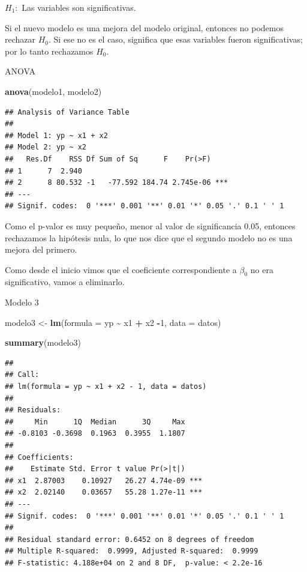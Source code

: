 \documentclass[
]{book}
\newenvironment{Shaded}{\begin{snugshade}}{\end{snugshade}}
\newcommand{\AttributeTok}[1]{\textcolor[rgb]{0.13,0.29,0.53}{#1}}
\newcommand{\DecValTok}[1]{\textcolor[rgb]{0.00,0.00,0.81}{#1}}
\newcommand{\FunctionTok}[1]{\textcolor[rgb]{0.13,0.29,0.53}{\textbf{#1}}}
\newcommand{\NormalTok}[1]{#1}
\newcommand{\OtherTok}[1]{\textcolor[rgb]{0.56,0.35,0.01}{#1}}
\newcommand{\SpecialCharTok}[1]{\textcolor[rgb]{0.81,0.36,0.00}{\textbf{#1}}}
\begin{document}
\(H_1:\) Las variables son significativas.

Si el nuevo modelo es una mejora del modelo original, entonces no podemos rechazar \(H_0\). Si ese no es el caso, significa que esas variables fueron significativas; por lo tanto rechazamos \(H_0\).

ANOVA

\begin{Shaded}
\begin{Highlighting}[]
\FunctionTok{anova}\NormalTok{(modelo1, modelo2)}
\end{Highlighting}
\end{Shaded}

\begin{verbatim}
## Analysis of Variance Table
## 
## Model 1: yp ~ x1 + x2
## Model 2: yp ~ x2
##   Res.Df    RSS Df Sum of Sq      F    Pr(>F)    
## 1      7  2.940                                  
## 2      8 80.532 -1   -77.592 184.74 2.745e-06 ***
## ---
## Signif. codes:  0 '***' 0.001 '**' 0.01 '*' 0.05 '.' 0.1 ' ' 1
\end{verbatim}

Como el p-valor es muy pequeño, menor al valor de significancia 0.05, entonces rechazamos la hipótesis nula, lo que nos dice que el segundo modelo no es una mejora del primero.

Como desde el inicio vimos que el coeficiente correspondiente a \(\beta_0\) no era significativo, vamos a eliminarlo.

Modelo 3

\begin{Shaded}
\begin{Highlighting}[]
\NormalTok{modelo3 }\OtherTok{\textless{}{-}} \FunctionTok{lm}\NormalTok{(}\AttributeTok{formula =}\NormalTok{ yp }\SpecialCharTok{\textasciitilde{}}\NormalTok{ x1 }\SpecialCharTok{+}\NormalTok{ x2 }\SpecialCharTok{{-}}\DecValTok{1}\NormalTok{, }\AttributeTok{data =}\NormalTok{ datos)}

\FunctionTok{summary}\NormalTok{(modelo3)}
\end{Highlighting}
\end{Shaded}

\begin{verbatim}
## 
## Call:
## lm(formula = yp ~ x1 + x2 - 1, data = datos)
## 
## Residuals:
##     Min      1Q  Median      3Q     Max 
## -0.8103 -0.3698  0.1963  0.3955  1.1807 
## 
## Coefficients:
##    Estimate Std. Error t value Pr(>|t|)    
## x1  2.87003    0.10927   26.27 4.74e-09 ***
## x2  2.02140    0.03657   55.28 1.27e-11 ***
## ---
## Signif. codes:  0 '***' 0.001 '**' 0.01 '*' 0.05 '.' 0.1 ' ' 1
## 
## Residual standard error: 0.6452 on 8 degrees of freedom
## Multiple R-squared:  0.9999, Adjusted R-squared:  0.9999 
## F-statistic: 4.188e+04 on 2 and 8 DF,  p-value: < 2.2e-16
\end{verbatim}
\end{document}
